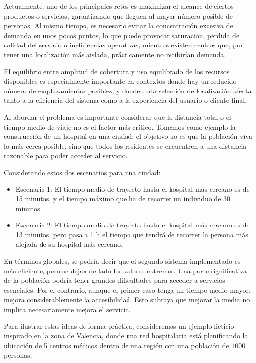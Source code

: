 \documentclass[12pt,a4paper]{book}
\begin{document}
Actualmente, uno de los principales retos es maximizar el alcance de ciertos productos o servicios, garantizando que lleguen al mayor número posible de personas. Al mismo tiempo, es necesario evitar la concentración excesiva de demanda en unos pocos puntos, lo que puede provocar saturación, pérdida de calidad del servicio o ineficiencias operativas, mientras existen centros que, por tener una localización más aislada, prácticamente no recibirían demanda.

El equilibrio entre amplitud de cobertura y uso equilibrado de los recursos disponibles es especialmente importante en contextos donde hay un reducido número de emplazamientos posibles, y donde cada selección de localización afecta tanto a la eficiencia del sistema como a la experiencia del usuario o cliente final.

Al abordar el problema es importante considerar que la distancia total o el tiempo medio de viaje no es el factor más crítico. 
Tomemos como ejemplo la construcción de un hospital en una ciudad: el objetivo no es que la población viva lo más cerca posible, sino que todos los residentes se encuentren a una distancia razonable para poder acceder al servicio.

Considerando estos dos escenarios para una ciudad:

\begin{itemize}
    \item Escenario 1: El tiempo medio de trayecto hasta el hospital más cercano es de 15 minutos, y el tiempo máximo que ha de recorrer un individuo de 30 minutos.
    \item Escenario 2: El tiempo medio de trayecto hasta el hospital más cercano es de 13 minutos, pero pasa a 1 h el tiempo que tendrá de recorrer la persona más alejada de su hospital más cercano.
\end{itemize} 

En términos globales, se podría decir que el segundo sistema implementado es más eficiente, pero se dejan de lado los valores extremos.
Una parte significativa de la población podría tener grandes dificultades para acceder a servicios esenciales.
Por el contrario, aunque el primer caso tenga un tiempo medio mayor, mejora considerablemente la accesibilidad. Esto subraya que mejorar la media no implica necesariamente mejora el servicio.
\newpage

Para ilustrar estas ideas de forma práctica, consideremos un ejemplo ficticio inspirado en la zona de Valencia, donde una red hospitalaria está
planificando la ubicación de 5 centros médicos dentro de una región con una población de $1000$ personas. 
\end{document}
